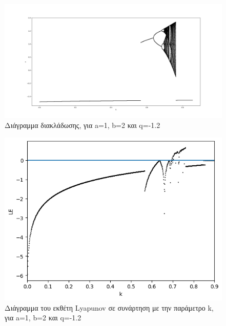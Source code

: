 \begin{figure}[h!]
	\centering
	\includegraphics[width=0.8\linewidth]{LateX images/graphs q12/g1}
	\caption{ Διάγραμμα διακλάδωσης, για a=1, b=2 και q=-1.2}
	\label{f:g16}
\end{figure}

\begin{figure}[h!]
	\centering
	\includegraphics[width=0.6\linewidth]{LateX images/graphs q12/g2}
	\caption{Διάγραμμα του εκθέτη Lyapunov σε συνάρτηση με την παράμετρο k, για a=1, b=2 και q=-1.2}
	\label{f:g17}
\end{figure}


